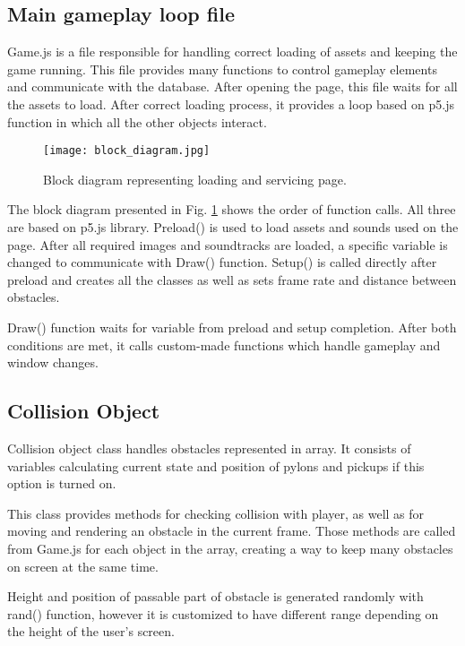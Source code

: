 \documentclass[oneside,a4paper,11pt]{report}
\begin{document}
\subsection{Main gameplay loop file}
Game.js is a file responsible for handling correct loading of assets and keeping the game running. This file provides many functions to control gameplay elements and communicate with the database. After opening the page, this file waits for all the assets to load. After correct loading process, it provides a loop based on p5.js function in which all the other objects interact.

\begin{figure}
	\centering
	\texttt{[image: block\_diagram.jpg]}
	\caption{Block diagram representing loading and servicing page.\label{fig:block_diagram}}
\end{figure}
	
\par
The block diagram presented in Fig. \ref{fig:block_diagram} shows the order of function calls. All three are based on p5.js library. Preload() is used to load assets and sounds used on the page. After all required images and soundtracks are loaded, a specific variable is changed to communicate with Draw() function. Setup() is called directly after preload and creates all the classes as well as sets frame rate and distance between obstacles.

\par
Draw() function waits for variable from preload and setup completion. After both conditions are met, it calls custom-made functions which handle gameplay and window changes.

\subsection{Collision Object}

Collision object class handles obstacles represented in array. It consists of variables calculating current state and position of pylons and pickups if this option is turned on.

\par
This class provides methods for checking collision with player, as well as for moving and rendering an obstacle in the current frame. Those methods are called from Game.js for each object in the array, creating a way to keep many obstacles on screen at the same time.

\par
Height and position of passable part of obstacle is generated randomly with rand() function, however it is customized to have different range depending on the height of the user's screen.
\end{document}
